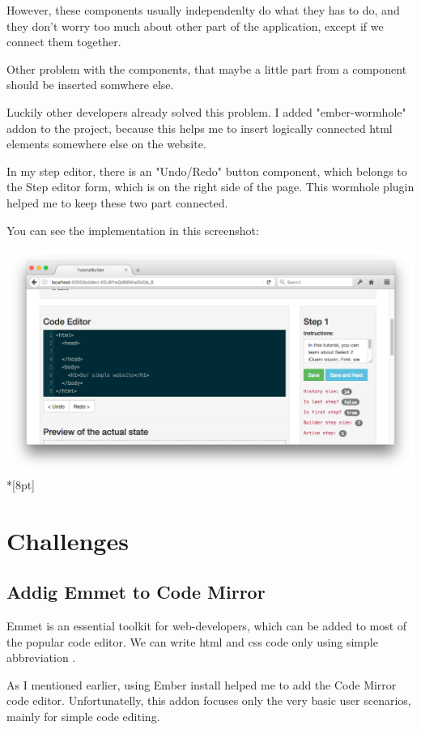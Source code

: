 \documentclass[12pt, a4paper, oneside, openright, medskipamount]{report}
\begin{document}
However, these components usually independenlty do what they has to do, and they don't worry too much about other part of the application, except if we connect them together.

Other problem with the components, that maybe a little part from a component should be inserted somwhere else.

Luckily other developers already solved this problem. I added "ember-wormhole" addon to the project, because this helps me to insert logically connected html elements somewhere else on the website.

In my step editor, there is an "Undo/Redo" button component, which belongs to the Step editor form, which is on the right side of the page. This wormhole plugin helped me to keep these two part connected.

You can see the implementation in this screenshot:

\includegraphics[width=1\textwidth]{assets/wormhole-screenshot.png}\\*[8pt]

\section{Challenges}

\subsection{Addig Emmet to Code Mirror}

Emmet is an essential toolkit for web-developers, which can be added to most of the popular code editor. We can write html and css code only using simple abbreviation \cite{emmet}.

As I mentioned earlier, using Ember install helped me to add the Code Mirror code editor. Unfortunatelly, this addon focuses only the very basic user scenarios, mainly for simple code editing.
\end{document}
